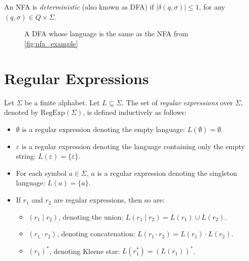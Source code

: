 An NFA is \emph{deterministic} (also known as DFA) if $|\delta(q,\sigma)| \leq 1$, for any $(q,\sigma) \in Q \times \Sigma$.

\begin{figure}[H]
\centering
{}
\caption{A DFA whose language is the same as the NFA from \ref{fig:nfa_example}} 
\end{figure}

\section{Regular Expressions}
Let $\Sigma$ be a finite alphabet. Let $L \subseteq \Sigma$. The set of \emph{regular expressions} over $\Sigma$, denoted by $\text{RegExp}(\Sigma)$, is defined inductively as follows:

\begin{itemize}
    \item $\emptyset$ is a regular expression denoting the empty language: $L(\emptyset) = \emptyset$.
    \item $\varepsilon$ is a regular expression denoting the language containing only the empty string: $L(\varepsilon) = \{ \varepsilon \}$.
    \item For each symbol $a \in \Sigma$, $a$ is a regular expression denoting the singleton language: $L(a) = \{ a \}$.
    \item If $r_1$ and $r_2$ are regular expressions, then so are:
    \begin{itemize}
        \item $(r_1 \mid r_2)$, denoting the union: $L(r_1 \mid r_2) = L(r_1) \cup L(r_2)$.
        \item $(r_1 \cdot r_2)$, denoting concatenation: $L(r_1 \cdot r_2) = L(r_1) \cdot L(r_2)$.
        \item $(r_1)^*$, denoting Kleene star: $L(r_1^*) = (L(r_1))^*$.
    \end{itemize}
\end{itemize}


